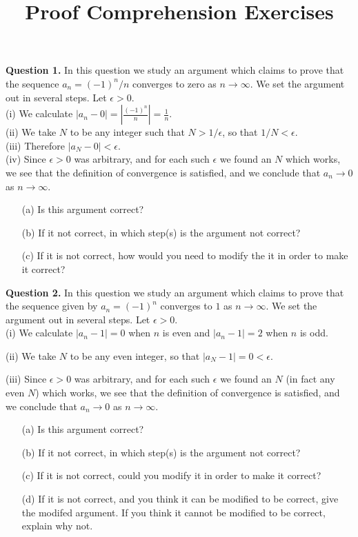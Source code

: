 \documentclass[12pt]{article}
\title{Proof Comprehension Exercises}
\begin{document}
\maketitle
\noindent
{\bf Question 1.} In this question we study an argument which claims to prove that the sequence $a_n = (-1)^n/n$ converges to zero as $n \to \infty$. We set the argument out in several steps. Let $\epsilon > 0$. \\

\medskip
(i) We calculate $|a_n - 0| = \left|\frac{(-1)^n}{n}\right| = \frac{1}{n}$.\\

(ii) We take $N$ to be any integer such that $N > {1/\epsilon}$, so that $1/N < \epsilon$. \\ 

(iii) Therefore $|a_N - 0| < \epsilon$.\\

(iv) Since $\epsilon > 0$ was arbitrary, and for each such $\epsilon$ we found an $N$ which works, we see that the definition of convergence is satisfied, and we conclude that $ a_n \to 0$ as $n \to \infty$.

\medskip
\begin{itemize}
\item [(a)] Is this argument correct?
\item [(b)] If it not correct, in which step(s) is the argument not correct?
\item [(c)] If it is not correct, how would you need to modify the it in order to make it correct?
\end{itemize}

\medskip
\noindent
{\bf Question 2.} In this question we study an argument which claims to prove that the sequence given by
$a_n = (-1)^n $
 converges to $1$ as $n \to \infty$. We set the argument out in several steps. Let $\epsilon > 0$. \\

\medskip
(i) We calculate $|a_n - 1| = 0$ when $n$ is even and $|a_n - 1| = 2$
when $n$ is odd.

\medskip
(ii) We take $N$ to be any even integer, so that $|a_N - 1| =0 <  \epsilon$.

\medskip
(iii) Since $\epsilon > 0$ was arbitrary, and for each such $\epsilon$ we found an $N$ (in fact any even $N$) which works, we see that the definition of convergence is satisfied, and we conclude that $ a_n \to 0$ as $n \to \infty$.

\begin{itemize}
\item[(a)] Is this argument correct?
\item[(b)] If it not correct, in which step(s) is the argument not correct?
\item[(c)] If it is not correct,  could you modify it in order to make it correct?
\item[(d)] If it is not correct, and you think it can be modified to be correct, give the modifed argument. If you think it cannot be modified to be correct, explain why not.

\end{itemize}
\end{document}
